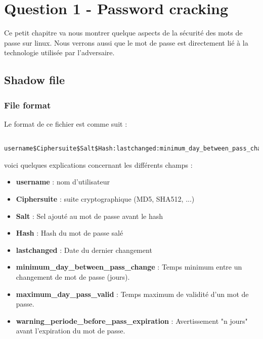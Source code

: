 
\chapter{Question 1 - Password cracking} %

\label{Chapitre 7.1} %



Ce petit chapitre va nous montrer quelque aspects de la sécurité des mots de passe sur linux. Nous verrons aussi que le mot de passe est directement lié à la technologie utilisée par l'adversaire.

\section{Shadow file}
\subsection{File format}
Le format de ce fichier est comme suit :
\begin{lstlisting}[frame=single,style=Console]  % Start your code-block

username$Ciphersuite$Salt$Hash:lastchanged:minimum_day_between_pass_change:maximum_day_pass_valid:warning_periode_before_pass_expiration:::
\end{lstlisting}

voici quelques explications concernant les différents champs :

\begin{itemize}
\item \textbf{username} : nom d'utilisateur
\item \textbf{Ciphersuite} : suite cryptographique (MD5, SHA512, ...)
\item \textbf{Salt} : Sel ajouté au mot de passe avant le hash
\item \textbf{Hash} : Hash du mot de passe salé 
\item \textbf{lastchanged} : Date du dernier changement
\item \textbf{minimum\_day\_between\_pass\_change} : Temps minimum entre un changement de mot de passe (jours).
\item \textbf{maximum\_day\_pass\_valid} : Temps maximum de validité d'un mot de passe.
\item \textbf{warning\_periode\_before\_pass\_expiration} : Avertissement "n jours" avant l'expiration du mot de passe.\\
\end{itemize}


